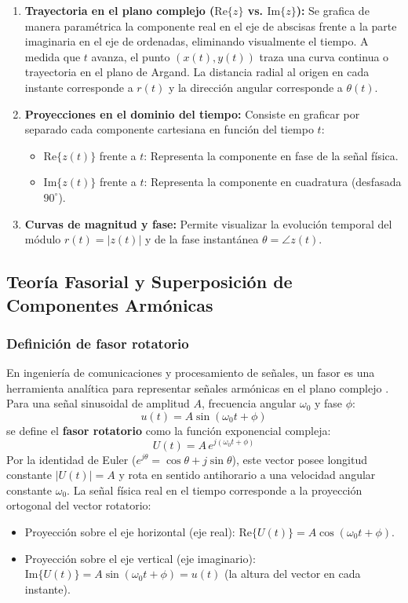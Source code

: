\documentclass[11pt,a4paper]{article}
\begin{document}
\begin{enumerate}
    \item \textbf{Trayectoria en el plano complejo ($\text{Re}\{z\}$ vs. $\text{Im}\{z\}$):}
    Se grafica de manera paramétrica la componente real en el eje de abscisas frente a la parte imaginaria en el eje de ordenadas, eliminando visualmente el tiempo. A medida que $t$ avanza, el punto $(x(t), y(t))$ traza una curva continua o trayectoria en el plano de Argand. La distancia radial al origen en cada instante corresponde a $r(t)$ y la dirección angular corresponde a $\theta(t)$.
    
    \item \textbf{Proyecciones en el dominio del tiempo:}
    Consiste en graficar por separado cada componente cartesiana en función del tiempo $t$:
    \begin{itemize}
        \item $\text{Re}\{z(t)\}$ frente a $t$: Representa la componente en fase de la señal física.
        \item $\text{Im}\{z(t)\}$ frente a $t$: Representa la componente en cuadratura (desfasada $90^\circ$).
    \end{itemize}
    
    \item \textbf{Curvas de magnitud y fase:}
    Permite visualizar la evolución temporal del módulo $r(t) = |z(t)|$  y de la fase instantánea $\theta = \angle z(t)$.
\end{enumerate}


\subsection{Teoría Fasorial y Superposición de Componentes Armónicas}
\subsubsection{Definición de fasor rotatorio}
En ingeniería de comunicaciones y procesamiento de señales, un fasor es una herramienta analítica para representar señales armónicas en el plano complejo \cite{oppenheim1997, lathi2009}. Para una señal sinusoidal de amplitud $A$, frecuencia angular $\omega_0$ y fase $\phi$:
\[
u(t) = A\sin(\omega_0 t + \phi)
\]
se define el \textbf{fasor rotatorio} como la función exponencial compleja:
\[
U(t) = A \, e^{j(\omega_0 t + \phi)}
\]
Por la identidad de Euler ($e^{j\theta} = \cos\theta + j\sin\theta$), este vector posee longitud constante $|U(t)| = A$ y rota en sentido antihorario a una velocidad angular constante $\omega_0$. La señal física real en el tiempo corresponde a la proyección ortogonal del vector rotatorio:
\begin{itemize}
    \item Proyección sobre el eje horizontal (eje real): $\text{Re}\{U(t)\} = A\cos(\omega_0 t + \phi)$.
    \item Proyección sobre el eje vertical (eje imaginario): $\text{Im}\{U(t)\} = A\sin(\omega_0 t + \phi) = u(t)$ (la altura del vector en cada instante).
\end{itemize}
\end{document}
